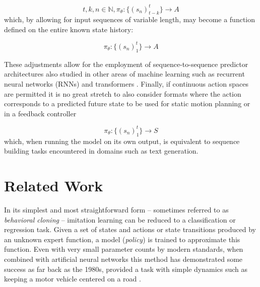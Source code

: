 \documentclass{article}
\begin{document}
\begin{equation}
	t, k, n \in \mathbb{N}, \pi_{\theta}:\lbrace {(s_n)_{t-k}^t} \rbrace \rightarrow A
\end{equation}
which, by allowing for input sequences of variable length, may become a function defined on the entire known state history:

\begin{equation}
	\pi_{\theta}:\lbrace {(s_n)_1^t} \rbrace \rightarrow A
\end{equation}

These adjustments allow for the employment of sequence-to-sequence predictor architectures also studied in other areas of machine learning such as recurrent neural networks (RNNs) \citep{rumelhart1985learning} and transformers \citep{vaswani2017attention}. Finally, if continuous action spaces are permitted it is no great stretch to also consider formats where the action corresponds to a predicted future state to be used for static motion planning or in a feedback controller

\begin{equation}
	\pi_{\theta}:\lbrace {(s_n)_1^t} \rbrace \rightarrow S
\end{equation}
which, when running the model on its own output, is equivalent to sequence building tasks encountered in domains such as text generation. 


\section{Related Work}
\label{sec:related}

In its simplest and most straightforward form -- sometimes referred to as \emph{behavioral cloning} -- imitation learning can be reduced to a classification or regression task. Given a set of states and actions or state transitions produced by an unknown expert function, a model (\emph{policy}) is trained to approximate this function. Even with very small parameter counts by modern standards, when combined with artificial neural networks this method has demonstrated some success as far back as the 1980s, provided a task with simple dynamics such as keeping a motor vehicle centered on a road \citep{pomerleau1989alvinn}.
\end{document}
